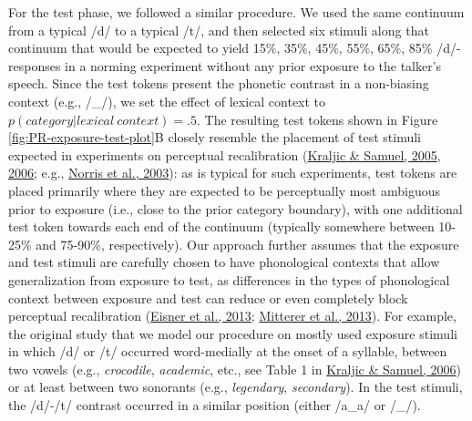 \documentclass[
  11pt,
  man,floatsintext]{apa6}
\begin{document}
For the test phase, we followed a similar procedure. We used the same continuum from a typical /d/ to a typical /t/, and then selected six stimuli along that continuum that would be expected to yield 15\%, 35\%, 45\%, 55\%, 65\%, 85\% /d/-responses in a norming experiment without any prior exposure to the talker's speech. Since the test tokens present the phonetic contrast in a non-biasing context (e.g., /\_/), we set the effect of lexical context to \(p(category | lexical\ context) = .5\). The resulting test tokens shown in Figure \ref{fig:PR-exposure-test-plot}B closely resemble the placement of test stimuli expected in experiments on perceptual recalibration (\protect\hyperlink{ref-kraljic-samuel2005}{Kraljic \& Samuel, 2005}, \protect\hyperlink{ref-kraljic-samuel2006}{2006}; e.g., \protect\hyperlink{ref-norris2003}{Norris et al., 2003}): as is typical for such experiments, test tokens are placed primarily where they are expected to be perceptually most ambiguous prior to exposure (i.e., close to the prior category boundary), with one additional test token towards each end of the continuum (typically somewhere between 10-25\% and 75-90\%, respectively). Our approach further assumes that the exposure and test stimuli are carefully chosen to have phonological contexts that allow generalization from exposure to test, as differences in the types of phonological context between exposure and test can reduce or even completely block perceptual recalibration (\protect\hyperlink{ref-eisner2013}{Eisner et al., 2013}; \protect\hyperlink{ref-mitterer2013}{Mitterer et al., 2013}). For example, the original study that we model our procedure on mostly used exposure stimuli in which /d/ or /t/ occurred word-medially at the onset of a syllable, between two vowels (e.g., \emph{crocodile}, \emph{academic}, etc., see Table 1 in \protect\hyperlink{ref-kraljic-samuel2006}{Kraljic \& Samuel, 2006}) or at least between two sonorants (e.g., \emph{legendary}, \emph{secondary}). In the test stimuli, the /d/-/t/ contrast occurred in a similar position (either /a\_a/ or /\_/).
\end{document}
